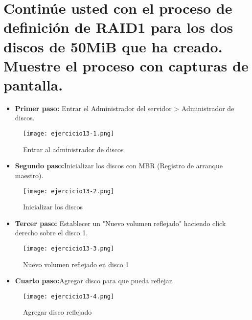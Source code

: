 	\section{Continúe usted con el proceso de definición de RAID1 para los dos discos de 50MiB que ha creado. Muestre el proceso con capturas de pantalla.}
	
	\begin{itemize}
	\item \textbf{Primer paso:} Entrar el Administrador del servidor >    Administrador de discos.
	\end{itemize}
	
	\begin{figure}[H]
		\centering
		\texttt{[image: ejercicio13-1.png]}  
		\label{figura18}
		\caption{Entrar al administrador de discos} 
	\end{figure}
	
	
	\begin{itemize}
		\item \textbf{Segundo paso:}Inicializar los discos con MBR (Registro de arranque maestro).
	\end{itemize}
	
	\begin{figure}[H]
		\centering
		\texttt{[image: ejercicio13-2.png]}  
		\label{figura19}
		\caption{Inicializar los discos} 
	\end{figure}
	
	\begin{itemize}
		\item \textbf{Tercer paso:} Establecer un "Nuevo volumen reflejado" haciendo click derecho sobre el disco 1.
	\end{itemize}
	
	\begin{figure}[H]
		\centering
		\texttt{[image: ejercicio13-3.png]}  
		\label{figura20}
		\caption{Nuevo volumen reflejado en disco 1} 
	\end{figure}
	
	\begin{itemize}
		\item \textbf{Cuarto paso:}Agregar disco para que pueda reflejar.
	\end{itemize}
	
	\begin{figure}[H]
		\centering
		\texttt{[image: ejercicio13-4.png]}  
		\label{figura21}
		\caption{Agregar disco reflejado} 
	\end{figure}
	
